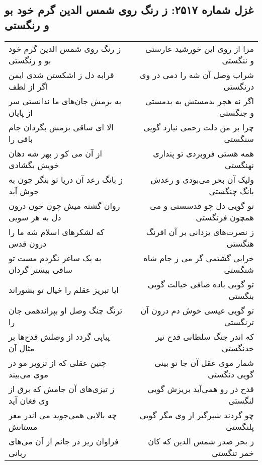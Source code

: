 \begin{center}
\section*{غزل شماره ۲۵۱۷: ز رنگ روی شمس الدین گرم خود بو و رنگستی}
\label{sec:2517}
\begin{longtable}{l p{0.5cm} r}
ز رنگ روی شمس الدین گرم خود بو و رنگستی
&&
مرا از روی این خورشید عارستی و ننگستی
\\
قرابه دل ز اشکستن شدی ایمن اگر از لطف
&&
شراب وصل آن شه را دمی در وی درنگستی
\\
به بزمش جان‌های ما ندانستی سر از پایان
&&
اگر نه هجر بدمستش به بدمستی و جنگستی
\\
الا ای ساقی بزمش بگردان جام باقی را
&&
چرا بر من دلت رحمی نیارد گویی سنگستی
\\
از آن می کو ز بهر شه دهان خویش بگشادی
&&
همه هستی فروبردی تو پنداری نهنگستی
\\
ز بانگ رعد آن دریا تو بنگر چون به جوش آید
&&
ولیک آن بحر می‌بودی و رعدش بانگ چنگستی
\\
روان گشته میش چون خون درون دل به هر سویی
&&
تو گویی دل چو قدسستی و می همچون فرنگستی
\\
که لشکرهای اسلام شه ما را درون قدس
&&
ز نصرت‌های یزدانی بر آن افرنگ هنگستی
\\
به یک ساغر نگردم مست تو ساقی بیشتر گردان
&&
خرابی گشتمی گر می ز جام شاه شنگستی
\\
ایا تبریز عقلم را خیال تو بشوراند
&&
تو گویی باده صافی خیالت گویی بنگستی
\\
ترنگ چنگ وصل او بپراندهمی جان را
&&
تو گویی عیسی خوش دم درون آن ترنگستی
\\
پیاپی گردد از وصلش قدح‌ها بر مثال آن
&&
که اندر جنگ سلطانی قدح تیر خدنگستی
\\
چنین عقلی که از تزویر مو در موی می‌بیند
&&
شمار موی عقل آن جا تو بینی گویی دنگستی
\\
ز تیزی‌های آن جامش که برق از وی فغان آید
&&
قدح در رو همی‌آید بریزش گویی لنگستی
\\
چه بالایی همی‌جوید می اندر مغز مستانش
&&
چو گردند شیرگیر از وی مگر گویی پلنگستی
\\
فراوان ریز در جانم از آن می‌های ربانی
&&
ز بحر صدر شمس الدین که کان خمر تنگستی
\\
\end{longtable}
\end{center}
